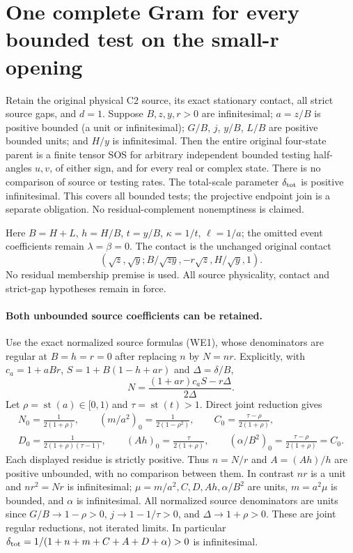\section{One complete Gram for every bounded test on the small-r opening}
\label{sec:r11-small-r-local}

\begin{theorem}
Retain the original physical C2 source, its exact stationary contact,
all strict source gaps, and $d=1$. Suppose $B,z,y,r>0$ are
infinitesimal; $a=z/B$ is positive bounded (a unit or infinitesimal);
$G/B$, $j$, $y/B$, $L/B$ are positive bounded units; and $H/y$
is infinitesimal.
Then the entire original four-state parent is a finite tensor SOS
for arbitrary independent bounded testing half-angles $u,v$, of either sign, and for every real or complex state.
There is no comparison of source or testing rates.
The total-scale parameter $\delta_{\rm tot}$ is positive infinitesimal.
This covers all bounded tests; the projective endpoint join is a
separate obligation. No residual-complement nonemptiness is claimed.
\end{theorem}

Here $B=H+L$, $h=H/B$, $t=y/B$, $\kappa=1/t$, $\ell=1/a$;
the omitted event coefficients remain $\lambda=\beta=0$.
The contact is the unchanged original contact
\[
 (\sqrt z,\sqrt y;B/\sqrt{zy},-r\sqrt z,H/\sqrt y,1).
\]
No residual membership premise is used. All source physicality,
contact and strict-gap hypotheses remain in force.

\paragraph{Both unbounded source coefficients can be retained.}
Use the exact normalized source formulas (WE1), whose denominators
are regular at $B=h=r=0$ after replacing $n$ by $N=nr$.
Explicitly, with $c_a=1+aBr$, $S=1+B(1-h+ar)$ and
$\Delta=\delta/B$,
\[
 N=\frac{(1+ar)c_aS-r\Delta}{2\Delta}.
\]
Let $\rho=\operatorname{st}(a)\in[0,1)$ and
$\tau=\operatorname{st}(t)>1$. Direct joint reduction gives
\[
\begin{gathered}
 N_0=\frac1{2(1+\rho)},\qquad
 (m/a^2)_0=\frac1{2(1-\rho^2)},\qquad
 C_0=\frac{\tau-\rho}{2(1+\rho)},\\
 D_0=\frac1{2(1+\rho)(\tau-1)},\qquad
 (Ah)_0=\frac\tau{2(1+\rho)},\qquad
 (\alpha/B^2)_0=\frac{\tau-\rho}{2(1+\rho)}=C_0.    \end{gathered}\tag{SL1}
\]
Each displayed residue is strictly positive. Thus $n=N/r$ and
$A=(Ah)/h$ are positive unbounded, with no comparison between
them. In contrast $nr$ is a unit and $nr^2=Nr$ is infinitesimal;
$\mu=m/a^2,C,D,Ah,\alpha/B^2$ are units, $m=a^2\mu$ is
bounded, and $\alpha$ is infinitesimal.
All normalized source denominators are units since
$G/B\to1-\rho>0$, $j\to1-1/\tau>0$, and
$\Delta\to1+\rho>0$. These are joint regular reductions,
not iterated limits. In particular
$\delta_{\rm tot}=1/(1+n+m+C+A+D+\alpha)>0$ is infinitesimal.

